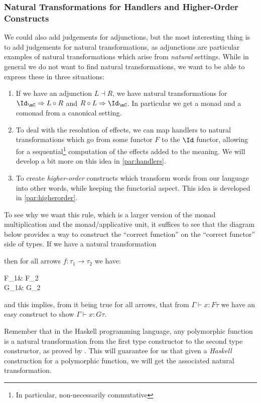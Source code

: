 \documentclass[math, english, info]{cours}
\def\cont{\Gamma\vdash}
\begin{document}
\subsubsection{Natural Transformations for Handlers and Higher-Order Constructs}\label{subsubsec:transnat}
We could also add judgements for adjunctions, but the most interesting thing is to add judgements for natural transformations, as adjunctions are particular examples of natural transformations which arise from \emph{natural} settings.
While in general we do not want to find natural transformations, we want to be able to express these in three situations:
\begin{enumerate}
	\item If we have an adjunction $L\dashv R$, we have natural transformations for $\Id_{\mC} \Rightarrow L \circ R$ and $R\circ L \Rightarrow \Id_{\mC}$.
	      In particular we get a monad and a comonad from a canonical setting.
	\item To deal with the resolution of effects, we can map handlers to natural transformations which go from some functor $F$ to the $\Id$ functor, allowing for a sequential\footnote{In particular, non-necessarily commutative} computation of the effects added to the meaning.
	      We will develop a bit more on this idea in \ref{par:handlers}.
	\item To create \emph{higher-order} constructs which transform words from our language into other words, while keeping the functorial aspect.
	      This idea is developed in \ref{par:higherorder}.
\end{enumerate}
To see why we want this rule, which is a larger version of the monad multiplication and the monad/applicative unit, it suffices to see that the diagram below provides a way to construct the ``correct function'' on the ``correct functor'' side of types. If we have a natural transformation  then for all arrows $f: \tau_{1} \to \tau_{2}$ we have:
\begin{category}
	F\tau_{1}\ar[r, "Ff"] & F\tau_{2}\\
	G\tau_{1}\ar[r, "Gf"] & G\tau_{2}
\end{category}
and this implies, from it being true for all arrows, that from $\cont x: F\tau$ we have an easy construct to show $\cont x: G\tau$.

Remember that in the Haskell programming language, any polymorphic function is a natural transformation from the first type constructor to the second type constructor, as proved by .
This will guarantee for us that given a \emph{Haskell} construction for a polymorphic function, we will get the associated natural transformation.
\end{document}
